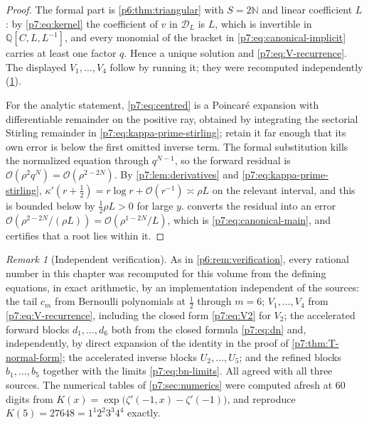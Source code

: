 \documentclass[11pt,a4paper,oneside]{book}
\theoremstyle{plain}
\theoremstyle{definition}
\theoremstyle{remark}
\newtheorem{remark}[theorem]{Remark}
\newcommand{\Nat}{\mathbb{N}}
\newcommand{\Rat}{\mathbb{Q}}
\newcommand{\bigO}{\mathcal{O}}
\begin{document}
\begin{proof}
The formal part is \cref{p6:thm:triangular} with $S=2\Nat$ and linear
coefficient $L$: by \eqref{p7:eq:kernel} the coefficient of $v$ in
$\mathcal{D}_L$ is $L$, which is invertible in $\Rat[C,L,L^{-1}]$, and every
monomial of the bracket in \eqref{p7:eq:canonical-implicit} carries at least
one factor $q$.  Hence a unique solution and \eqref{p7:eq:V-recurrence}.  The
displayed $V_1,\dots,V_4$ follow by running it; they were recomputed
independently (\cref{p7:rem:verification}).

For the analytic statement, \eqref{p7:eq:centred} is a Poincar\'e expansion
with differentiable remainder on the positive ray, obtained by integrating the
sectorial Stirling remainder in \eqref{p7:eq:kappa-prime-stirling}; retain it
far enough that its own error is below the first omitted inverse term.  The
formal substitution kills the normalized equation through $q^{N-1}$, so the
forward residual is $\bigO(\rho^{2}q^{N})=\bigO(\rho^{2-2N})$.  By
\cref{p7:lem:derivatives} and \eqref{p7:eq:kappa-prime-stirling},
$\kappa'(r+\tfrac12)=r\log r+\bigO(r^{-1})\asymp\rho L$ on the relevant
interval, and this is bounded below by $\tfrac12\rho L>0$ for large $y$.
 converts the residual into an error
$\bigO(\rho^{2-2N}/(\rho L))=\bigO(\rho^{1-2N}/L)$, which is
\eqref{p7:eq:canonical-main}, and certifies that a root lies within it.
\end{proof}

\begin{remark}[Independent verification]\label{p7:rem:verification}
As in \cref{p6:rem:verification}, every rational number in this chapter was
recomputed for this volume from the defining equations, in exact arithmetic,
by an implementation independent of the sources: the tail $c_m$ from Bernoulli
polynomials at $\tfrac12$ through $m=6$; $V_1,\dots,V_4$ from
\eqref{p7:eq:V-recurrence}, including the closed form
\eqref{p7:eq:V2} for $V_2$; the accelerated forward blocks $d_1,\dots,d_6$
both from the closed formula \eqref{p7:eq:dn} and, independently, by direct
expansion of the identity in the proof of \cref{p7:thm:T-normal-form}; the
accelerated inverse blocks $U_2,\dots,U_5$; and the refined blocks
$b_1,\dots,b_5$ together with the limits \eqref{p7:eq:bn-limits}.  All agreed
with all three sources.  The numerical tables of
\cref{p7:sec:numerics} were computed afresh at $60$ digits from
$K(x)=\exp\bigl(\zeta'(-1,x)-\zeta'(-1)\bigr)$, and reproduce
$K(5)=27648=1^{1}2^{2}3^{3}4^{4}$ exactly.
\end{remark}
\end{document}
